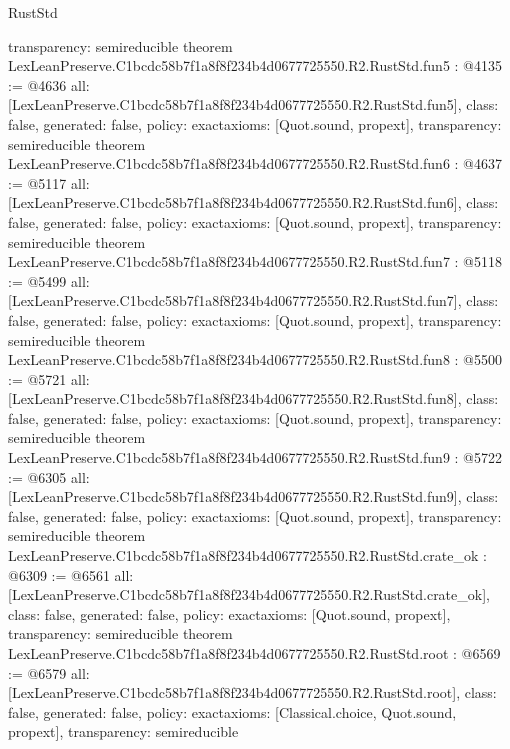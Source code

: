 \begin{lexlean}{RustStd}
\begin{coremodule}
{  transparency: semireducible
}
theorem LexLeanPreserve.C1bcdc58b7f1a8f8f234b4d0677725550.R2.RustStd.fun5 : @4135 := @4636 {
  all: [LexLeanPreserve.C1bcdc58b7f1a8f8f234b4d0677725550.R2.RustStd.fun5],
  class: false,
  generated: false,
  policy: exact{axioms: [Quot.sound, propext]},
  transparency: semireducible
}
theorem LexLeanPreserve.C1bcdc58b7f1a8f8f234b4d0677725550.R2.RustStd.fun6 : @4637 := @5117 {
  all: [LexLeanPreserve.C1bcdc58b7f1a8f8f234b4d0677725550.R2.RustStd.fun6],
  class: false,
  generated: false,
  policy: exact{axioms: [Quot.sound, propext]},
  transparency: semireducible
}
theorem LexLeanPreserve.C1bcdc58b7f1a8f8f234b4d0677725550.R2.RustStd.fun7 : @5118 := @5499 {
  all: [LexLeanPreserve.C1bcdc58b7f1a8f8f234b4d0677725550.R2.RustStd.fun7],
  class: false,
  generated: false,
  policy: exact{axioms: [Quot.sound, propext]},
  transparency: semireducible
}
theorem LexLeanPreserve.C1bcdc58b7f1a8f8f234b4d0677725550.R2.RustStd.fun8 : @5500 := @5721 {
  all: [LexLeanPreserve.C1bcdc58b7f1a8f8f234b4d0677725550.R2.RustStd.fun8],
  class: false,
  generated: false,
  policy: exact{axioms: [Quot.sound, propext]},
  transparency: semireducible
}
theorem LexLeanPreserve.C1bcdc58b7f1a8f8f234b4d0677725550.R2.RustStd.fun9 : @5722 := @6305 {
  all: [LexLeanPreserve.C1bcdc58b7f1a8f8f234b4d0677725550.R2.RustStd.fun9],
  class: false,
  generated: false,
  policy: exact{axioms: [Quot.sound, propext]},
  transparency: semireducible
}
theorem LexLeanPreserve.C1bcdc58b7f1a8f8f234b4d0677725550.R2.RustStd.crate_ok : @6309 := @6561 {
  all: [LexLeanPreserve.C1bcdc58b7f1a8f8f234b4d0677725550.R2.RustStd.crate_ok],
  class: false,
  generated: false,
  policy: exact{axioms: [Quot.sound, propext]},
  transparency: semireducible
}
theorem LexLeanPreserve.C1bcdc58b7f1a8f8f234b4d0677725550.R2.RustStd.root : @6569 := @6579 {
  all: [LexLeanPreserve.C1bcdc58b7f1a8f8f234b4d0677725550.R2.RustStd.root],
  class: false,
  generated: false,
  policy: exact{axioms: [Classical.choice, Quot.sound, propext]},
  transparency: semireducible
}


\end{coremodule}
\end{lexlean}
